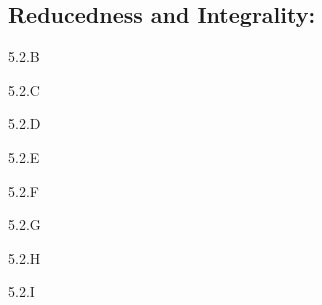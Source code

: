 \subsection{Reducedness and Integrality:}

\begin{exercise}{5.2.B}

\end{exercise}
\begin{solution}
    \todo{}
\end{solution}

\begin{exercise}{5.2.C}

\end{exercise}
\begin{solution}
    \todo{}
\end{solution}

\begin{exercise}{5.2.D}
\end{exercise}
\begin{solution}
    \todo{}
\end{solution}

\begin{exercise}{5.2.E}

\end{exercise}
\begin{solution}
    \todo{}
\end{solution}

\begin{exercise}{5.2.F}

\end{exercise}
\begin{solution}
    \todo{}
\end{solution}

\begin{exercise}{5.2.G}

\end{exercise}
\begin{solution}
    \todo{}
\end{solution}

\begin{exercise}{5.2.H}

\end{exercise}
\begin{solution}
    \todo{}
\end{solution}

\begin{exercise}{5.2.I}

\end{exercise}
\begin{solution}
    \todo{}
\end{solution}


